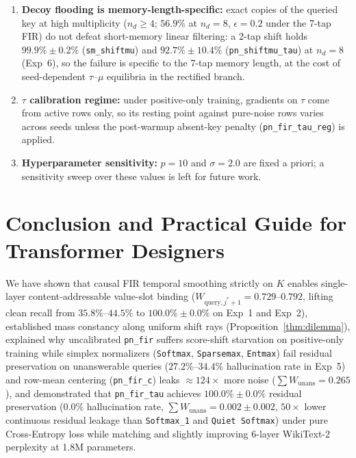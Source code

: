 \documentclass[11pt,a4paper]{article}
\begin{document}
\begin{enumerate}
\item \textbf{Decoy flooding is memory-length-specific:} exact copies of the queried key at high multiplicity ($n_d \ge 4$; $56.9\%$ at $n_d{=}8$, $\epsilon{=}0.2$ under the 7-tap FIR) do not defeat short-memory linear filtering: a 2-tap shift holds $99.9\% \pm 0.2\%$ (\texttt{sm\_shiftmu}) and $92.7\% \pm 10.4\%$ (\texttt{pn\_shiftmu\_tau}) at $n_d{=}8$ (Exp~6), so the failure is specific to the 7-tap memory length, at the cost of seed-dependent $\tau$--$\mu$ equilibria in the rectified branch.
\item \textbf{$\tau$ calibration regime:} under positive-only training, gradients on $\tau$ come from active rows only, so its resting point against pure-noise rows varies across seeds unless the post-warmup absent-key penalty (\texttt{pn\_fir\_tau\_reg}) is applied.
\item \textbf{Hyperparameter sensitivity:} $p=10$ and $\sigma=2.0$ are fixed a priori; a sensitivity sweep over these values is left for future work.
\end{enumerate}

\section{Conclusion and Practical Guide for Transformer Designers}

We have shown that causal FIR temporal smoothing strictly on $K$ enables single-layer content-addressable value-slot binding ($W_{\text{query}, j^*+1} = 0.729\text{--}0.792$, lifting clean recall from $35.8\%\text{--}44.5\%$ to $100.0\% \pm 0.0\%$ on Exp~1 and Exp~2), established mass constancy along uniform shift rays (Proposition~\ref{thm:dilemma}), explained why uncalibrated \texttt{pn\_fir} suffers score-shift starvation on positive-only training while simplex normalizers (\texttt{Softmax}, \texttt{Sparsemax}, \texttt{Entmax}) fail residual preservation on unanswerable queries ($27.2\%\text{--}34.4\%$ hallucination rate in Exp~5) and row-mean centering (\texttt{pn\_fir\_c}) leaks $\approx 124\times$ more noise ($\sum W_{\text{unans}} = 0.265$), and demonstrated that \texttt{pn\_fir\_tau} achieves $100.0\% \pm 0.0\%$ residual preservation ($0.0\%$ hallucination rate, $\sum W_{\text{unans}} = 0.002 \pm 0.002$, $50\times$ lower continuous residual leakage than \texttt{Softmax\_1} and \texttt{Quiet Softmax}) under pure Cross-Entropy loss while matching and slightly improving 6-layer WikiText-2 perplexity at 1.8M parameters.
\end{document}
